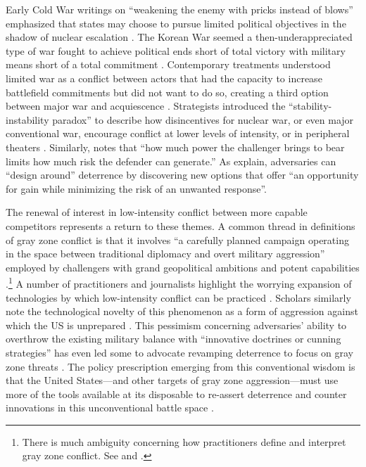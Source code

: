 \documentclass[11pt,letterpaper,pdftex,dvipsnames,table]{article}
\begin{document}
Early Cold War writings on “weakening the enemy with pricks instead of blows” emphasized that states may choose to pursue limited political objectives in the shadow of nuclear escalation \citep[186]{hart_strategyindirectapproach_1967}. The Korean War seemed a then-underappreciated type of war fought to achieve political ends short of total victory with military means short of a total commitment \citep{osgood_reappraisallimitedwar_1969}. Contemporary treatments understood limited war as a conflict between actors that had the capacity to increase battlefield commitments but did not want to do so, creating a third option between major war and acquiescence \citep{brodie_morelimitedwar_1957, kissinger_strategyorganization_1957}. 
Strategists introduced the ``stability-instability paradox'' to describe how disincentives for nuclear war, or even major conventional war, encourage conflict at lower levels of intensity, or in peripheral theaters \citep{snyder_balancepowerbalance_1965, jervis_illogicamericannuclear_1984}. 
Similarly, \citet[598]{powell_nuclearbrinkmanshiplimited_2015} notes that “how much power the challenger brings to bear limits how much risk the defender can generate.” 
As \citet[173]{george_deterrenceforeignpolicy_1989} explain, adversaries can ``design around'' deterrence by discovering new options that offer “an opportunity for gain while minimizing the risk of an unwanted response”. 

The renewal of interest in low-intensity conflict between more capable competitors represents a return to these themes. A common thread in definitions of gray zone conflict is that it involves “a carefully planned campaign operating in the space between traditional diplomacy and overt military aggression” employed by challengers with grand geopolitical ambitions and potent capabilities \citep{mazarr_strugglegrayzone_2015}.\footnote{There is much ambiguity concerning how practitioners define and interpret gray zone conflict. See \citet{bragg_integrationreportgray_2017} and \citet{janicatova_ambiguityhybridwarfare_2021}.} A number of practitioners and journalists highlight the worrying expansion of technologies by which low-intensity conflict can be practiced \citep{olson_americanotready_2015}. Scholars similarly note the technological novelty of this phenomenon as a form of aggression against which the US is unprepared \citep{hoffman_conflict21stcentury_2007, thornton_changingnaturemodern_2015, brands_paradoxesgrayzone_2016, jackson_informationnotweapons_2016, wirtz_lifegrayzone_2017, hughes_wargreyzone_2020}. This pessimism concerning adversaries' ability to overthrow the existing military balance with ``innovative doctrines or cunning strategies'' \citep[906]{goldstein_uschinanaval_2017} has even led some to advocate revamping deterrence to focus on gray zone threats \citep{tor_cumulativedeterrencenew_2015, matisek_shadesgraydeterrence_2017}. The policy prescription emerging from this conventional wisdom is that the United States---and other targets of gray zone aggression---must use more of the tools available at its disposable to re-assert deterrence and counter innovations in this unconventional battle space \citep{hicks_othermeanspart_2019, mccarthy_deterringrussiagray_2019}.
\end{document}
